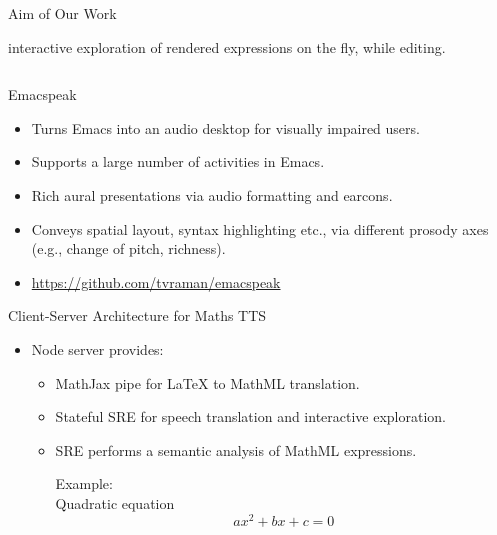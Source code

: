 \documentclass[final,hyperref={pdfpagelabels=false}]{beamer}
\begin{document}
\begin{frame}{}
\begin{columns}[t]
\begin{column}{.48\linewidth}
\begin{block}{\Large Aim of Our Work}
\begin{itemize}
\begin{itemize}
            interactive exploration of rendered expressions on the fly, while editing. 
          \end{itemize}
        \end{itemize}
      \end{block}
    \end{column}
  \end{columns}
  \vfill
  \begin{columns}[t]
    \begin{column}{.32\linewidth}
      \begin{block}{\Large Emacspeak}
        \begin{itemize}
        \item Turns Emacs into an audio desktop for visually impaired users.
        \item Supports a large number of activities in Emacs.
        \item Rich aural presentations via audio formatting and earcons.
        \item Conveys spatial layout, syntax highlighting etc., via different
          prosody axes (e.g., change of pitch, richness).
        \item \textcolor{red}{\url{https://github.com/tvraman/emacspeak}}
        \end{itemize}
      \end{block}
      \begin{block}{\Large Client-Server Architecture for Maths TTS}
        \begin{itemize}
        \item Node server provides:
          \begin{itemize}
          \item MathJax pipe for {\LaTeX} to MathML translation.
          \item Stateful SRE for speech translation and interactive exploration.
          \item SRE performs a semantic analysis of MathML expressions.\\
            \begin{minipage}{.3\linewidth}
              Example:\\
              Quadratic equation\\
              \[ax^2 + bx + c = 0\]
            \end{minipage}
            \begin{minipage}{0.2\linewidth}\tiny
              
            \end{minipage}
            \begin{minipage}{0.45\linewidth}
              

\end{minipage}
\end{itemize}
\end{itemize}
\end{block}
\end{column}
\end{columns}
\end{frame}
\end{document}
